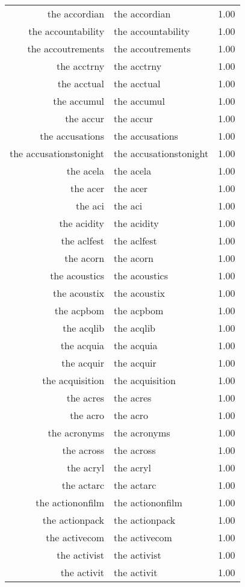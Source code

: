 \begin{table}[ht]
\begin{tabular}{rlr}
  the accordian & the accordian & 1.00 \\ 
  the accountability & the accountability & 1.00 \\ 
  the accoutrements & the accoutrements & 1.00 \\ 
  the acctrny & the acctrny & 1.00 \\ 
  the acctual & the acctual & 1.00 \\ 
  the accumul & the accumul & 1.00 \\ 
  the accur & the accur & 1.00 \\ 
  the accusations & the accusations & 1.00 \\ 
  the accusationstonight & the accusationstonight & 1.00 \\ 
  the acela & the acela & 1.00 \\ 
  the acer & the acer & 1.00 \\ 
  the aci & the aci & 1.00 \\ 
  the acidity & the acidity & 1.00 \\ 
  the aclfest & the aclfest & 1.00 \\ 
  the acorn & the acorn & 1.00 \\ 
  the acoustics & the acoustics & 1.00 \\ 
  the acoustix & the acoustix & 1.00 \\ 
  the acpbom & the acpbom & 1.00 \\ 
  the acqlib & the acqlib & 1.00 \\ 
  the acquia & the acquia & 1.00 \\ 
  the acquir & the acquir & 1.00 \\ 
  the acquisition & the acquisition & 1.00 \\ 
  the acres & the acres & 1.00 \\ 
  the acro & the acro & 1.00 \\ 
  the acronyms & the acronyms & 1.00 \\ 
  the across & the across & 1.00 \\ 
  the acryl & the acryl & 1.00 \\ 
  the actarc & the actarc & 1.00 \\ 
  the actiononfilm & the actiononfilm & 1.00 \\ 
  the actionpack & the actionpack & 1.00 \\ 
  the activecom & the activecom & 1.00 \\ 
  the activist & the activist & 1.00 \\ 
  the activit & the activit & 1.00 \\ 

\end{tabular}
\end{table}
